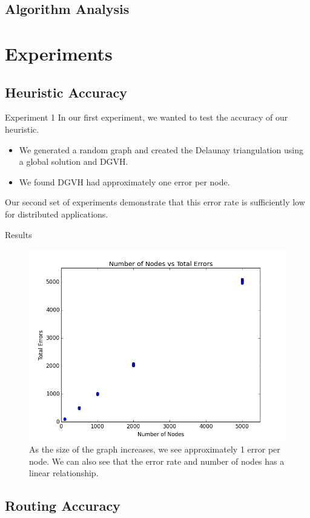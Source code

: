 \documentclass[8pt]{beamer}
\begin{document}
\subsection{Algorithm Analysis}
	
	
\section{Experiments}
	
\subsection{Heuristic Accuracy}

	\begin{frame}{Experiment 1}
		In our first experiment, we wanted to test the accuracy of our heuristic.
		\begin{itemize}
			\item We generated a random graph and created the Delaunay triangulation using a global solution and DGVH.
			\item We found DGVH had approximately one error per node.
		\end{itemize}
		
		Our second set of experiments demonstrate that this error rate is sufficiently low for distributed applications.
	\end{frame}


\begin{frame}{Results}
\begin{figure}
	\centering
	\includegraphics[width=0.5\linewidth]{error_rate}
	\caption{As the size of the graph increases, we see approximately 1 error per node.
	We can also see that the error rate and number of nodes has a linear relationship.}
	\label{exp_0}
\end{figure}
\end{frame}

\subsection{Routing Accuracy}
\end{document}
